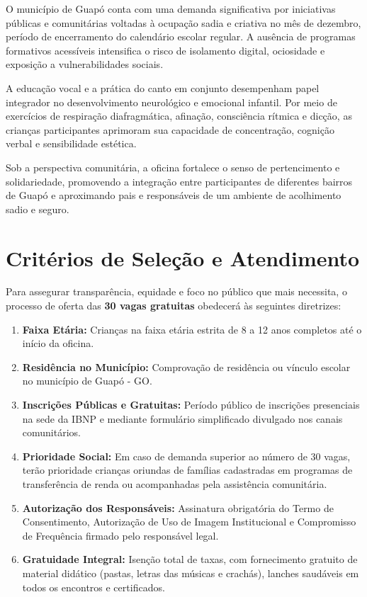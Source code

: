 \documentclass[12pt,a4paper]{article}
\begin{document}
O município de Guapó conta com uma demanda significativa por iniciativas públicas e comunitárias voltadas à ocupação sadia e criativa no mês de dezembro, período de encerramento do calendário escolar regular. A ausência de programas formativos acessíveis intensifica o risco de isolamento digital, ociosidade e exposição a vulnerabilidades sociais.

A educação vocal e a prática do canto em conjunto desempenham papel integrador no desenvolvimento neurológico e emocional infantil. Por meio de exercícios de respiração diafragmática, afinação, consciência rítmica e dicção, as crianças participantes aprimoram sua capacidade de concentração, cognição verbal e sensibilidade estética.

Sob a perspectiva comunitária, a oficina fortalece o senso de pertencimento e solidariedade, promovendo a integração entre participantes de diferentes bairros de Guapó e aproximando pais e responsáveis de um ambiente de acolhimento sadio e seguro.

\vspace{0.3cm}

\section{Critérios de Seleção e Atendimento}

Para assegurar transparência, equidade e foco no público que mais necessita, o processo de oferta das \textbf{30 vagas gratuitas} obedecerá às seguintes diretrizes:

\begin{enumerate}
    \item \textbf{Faixa Etária:} Crianças na faixa etária estrita de 8 a 12 anos completos até o início da oficina.
    \item \textbf{Residência no Município:} Comprovação de residência ou vínculo escolar no município de Guapó - GO.
    \item \textbf{Inscrições Públicas e Gratuitas:} Período público de inscrições presenciais na sede da IBNP e mediante formulário simplificado divulgado nos canais comunitários.
    \item \textbf{Prioridade Social:} Em caso de demanda superior ao número de 30 vagas, terão prioridade crianças oriundas de famílias cadastradas em programas de transferência de renda ou acompanhadas pela assistência comunitária.
    \item \textbf{Autorização dos Responsáveis:} Assinatura obrigatória do Termo de Consentimento, Autorização de Uso de Imagem Institucional e Compromisso de Frequência firmado pelo responsável legal.
    \item \textbf{Gratuidade Integral:} Isenção total de taxas, com fornecimento gratuito de material didático (pastas, letras das músicas e crachás), lanches saudáveis em todos os encontros e certificados.
\end{enumerate}
\end{document}
